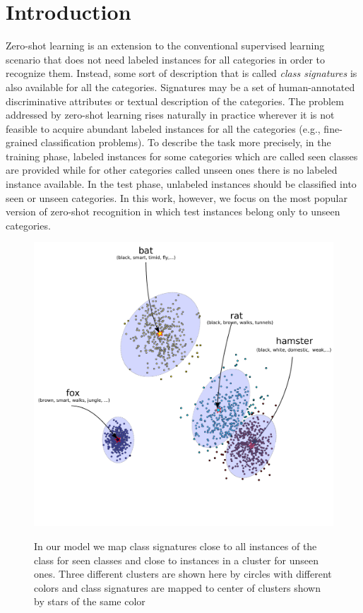 \documentclass[10pt,twocolumn,letterpaper]{article}
\begin{document}
\section{Introduction}
Zero-shot learning \cite{bengio08, hinton09,lampert09,farhadi09} is an extension to the conventional supervised learning scenario
that does not need labeled instances for all categories in order to recognize them.
Instead, some sort of description that is called \textit{class signatures} is also available for all the categories.
Signatures may be a set of human-annotated discriminative attributes or textual description of the categories.
The problem addressed by zero-shot learning rises naturally in practice wherever it is not feasible to acquire abundant labeled instances for all the categories (e.g., fine-grained classification problems).
To describe the task more precisely, in the training phase, labeled instances for some categories which are called seen classes are provided
while for other categories called unseen ones there is no labeled instance available.
In the test phase, unlabeled instances should be classified into seen or unseen categories. In this work, however, we focus on the most popular version of zero-shot recognition in which test instances belong only to unseen categories.
 \begin{figure}[!t]
 \begin{center}
   \label{fig:overview}
 \includegraphics[width=0.98\columnwidth]{overview.pdf}
 \caption{In our model we map class signatures close to all instances of the class for seen classes and close to instances in a cluster for unseen ones.
 Three different clusters are shown here by circles with different colors and class signatures are mapped to center of clusters shown by stars of the same color}
 \end{center}
 \vspace{-8mm}
 \end{figure}
\end{document}
